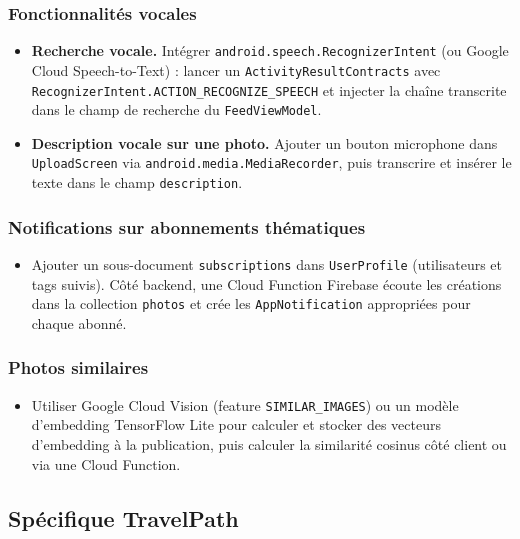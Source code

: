 \documentclass[a4paper, 12pt]{article}
\begin{document}
\begin{justify}
\subsubsection*{Fonctionnalités vocales}

\begin{itemize}
    \item \textbf{Recherche vocale.} Intégrer \texttt{android.\allowbreak{}speech.\allowbreak{}RecognizerIntent} (ou Google Cloud Speech-to-Text) : lancer un \texttt{ActivityResultContracts} avec \texttt{RecognizerIntent.\allowbreak{}ACTION\_RECOGNIZE\_SPEECH} et injecter la chaîne transcrite dans le champ de recherche du \texttt{FeedViewModel}.
    \item \textbf{Description vocale sur une photo.} Ajouter un bouton microphone dans \texttt{UploadScreen} via \texttt{android.\allowbreak{}media.\allowbreak{}MediaRecorder}, puis transcrire et insérer le texte dans le champ \texttt{description}.
\end{itemize}

\subsubsection*{Notifications sur abonnements thématiques}

\begin{itemize}
    \item Ajouter un sous-document \texttt{subscriptions} dans \texttt{UserProfile} (utilisateurs et tags suivis). Côté backend, une Cloud Function Firebase écoute les créations dans la collection \texttt{photos} et crée les \texttt{AppNotification} appropriées pour chaque abonné.
\end{itemize}

\subsubsection*{Photos similaires}

\begin{itemize}
    \item Utiliser Google Cloud Vision (feature \texttt{SIMILAR\_IMAGES}) ou un modèle d'embedding TensorFlow Lite pour calculer et stocker des vecteurs d'embedding à la publication, puis calculer la similarité cosinus côté client ou via une Cloud Function.
\end{itemize}


\subsection*{Spécifique TravelPath}


\end{justify}
\end{document}
